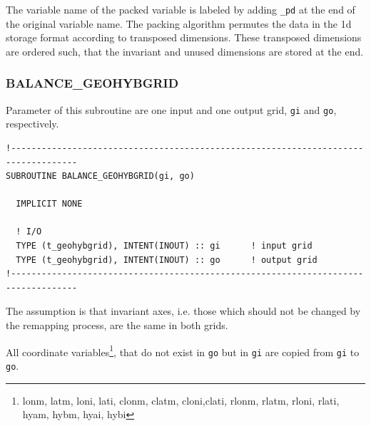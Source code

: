 \documentclass[11pt,twoside]{article}
\begin{document}
The variable name of the packed variable is labeled by adding \verb|_pd| at
the end of the original variable name. The packing algorithm permutes
the data in the 1d storage format according to transposed dimensions.
These transposed dimensions are ordered such, that the invariant and unused
dimensions are stored at the end.

\subsubsection{BALANCE\_GEOHYBGRID\label{BALGRID}}
Parameter of this subroutine are one input and one output grid, \verb|gi| and
\verb|go|, respectively.
\begin{verbatim}
!-----------------------------------------------------------------------------------
SUBROUTINE BALANCE_GEOHYBGRID(gi, go)

  IMPLICIT NONE

  ! I/O
  TYPE (t_geohybgrid), INTENT(INOUT) :: gi      ! input grid
  TYPE (t_geohybgrid), INTENT(INOUT) :: go      ! output grid
!-----------------------------------------------------------------------------------
\end{verbatim}
The assumption is that invariant axes, i.e. those which should not be
changed by the remapping process, are the same in both grids.

All coordinate variables\footnote{\rm lonm, latm, loni, lati, clonm, clatm, cloni,clati, rlonm, rlatm, rloni, rlati, hyam, hybm, hyai, hybi}, 
that do not exist in \verb|go| but in \verb|gi| are copied from \verb|gi| to \verb|go|.
\end{document}
